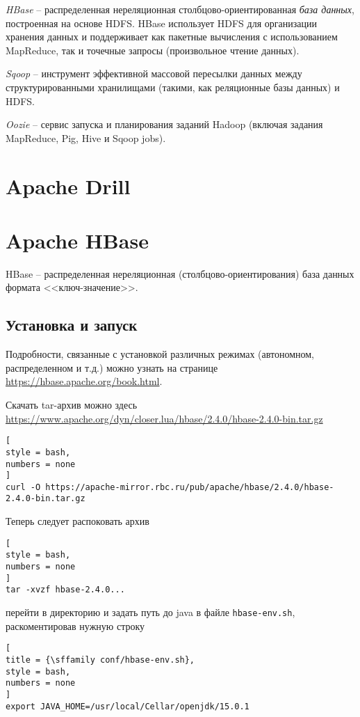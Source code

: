 \documentclass[%
	11pt,
	a4paper,
	utf8,
		]{article}
\begin{document}
\emph{HBase} -- распределенная нереляционная столбцово-ориентированная \emph{база данных}, построенная на основе HDFS. HBase использует HDFS для организации хранения данных и поддерживает как пакетные вычисления с использованием MapReduce, так и точечные запросы (произвольное чтение данных).

\emph{Sqoop} -- инструмент эффективной массовой пересылки данных между структурированными хранилищами (такими, как реляционные базы данных) и HDFS.

\emph{Oozie} -- сервис запуска и планирования заданий Hadoop (включая задания MapReduce, Pig, Hive и Sqoop jobs).

\section{Apache Drill}

\section{Apache HBase}

HBase -- распределенная нереляционная (столбцово-ориентирования) база данных формата <<ключ-значение>>. 

\subsection{Установка и запуск}

Подробности, связанные с установкой различных режимах (автономном, распределенном и т.д.) можно узнать на странице \url{https://hbase.apache.org/book.html}.

Скачать tar-архив можно здесь \url{https://www.apache.org/dyn/closer.lua/hbase/2.4.0/hbase-2.4.0-bin.tar.gz}
\begin{lstlisting}[
style = bash,
numbers = none	
]
curl -O https://apache-mirror.rbc.ru/pub/apache/hbase/2.4.0/hbase-2.4.0-bin.tar.gz
\end{lstlisting}

Теперь следует распоковать архив
\begin{lstlisting}[
style = bash,
numbers = none	
]
tar -xvzf hbase-2.4.0...
\end{lstlisting}
перейти в директорию  и задать путь до java в файле \texttt{hbase-env.sh}, раскоментировав нужную строку
\begin{lstlisting}[
title = {\sffamily conf/hbase-env.sh},
style = bash,
numbers = none	
]
export JAVA_HOME=/usr/local/Cellar/openjdk/15.0.1
\end{lstlisting}
\end{document}
